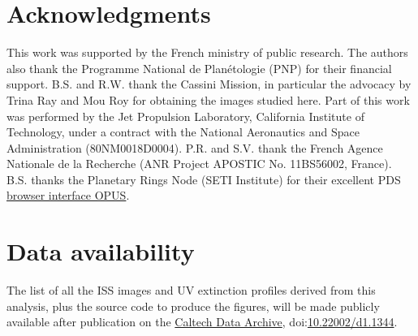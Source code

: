 \section*{Acknowledgments}

This work was supported by the French ministry of public research. The authors also thank the Programme National de Plan\'{e}tologie (PNP) for their financial support.
B.S. and R.W. thank the Cassini Mission, in particular the advocacy by Trina Ray and Mou Roy for obtaining the images studied here.
Part of this work was performed by the Jet Propulsion Laboratory, California Institute of Technology, under a contract with the National Aeronautics and Space Administration (80NM0018D0004).
P.R. and S.V. thank the French Agence Nationale de la Recherche (ANR Project APOSTIC No. 11BS56002, France).
B.S. thanks the Planetary Rings Node (SETI Institute) for their excellent PDS \href{https://tools.pds-rings.seti.org/opus}{browser interface OPUS}.

\section*{Data availability}
The list of all the ISS images and UV extinction profiles derived from this analysis, plus the source code to produce the figures, will be made
publicly available after publication on the \href{https://data.caltech.edu}{Caltech Data Archive},
doi:\href{https://doi.org/10.22002/d1.1344}{10.22002/d1.1344}.